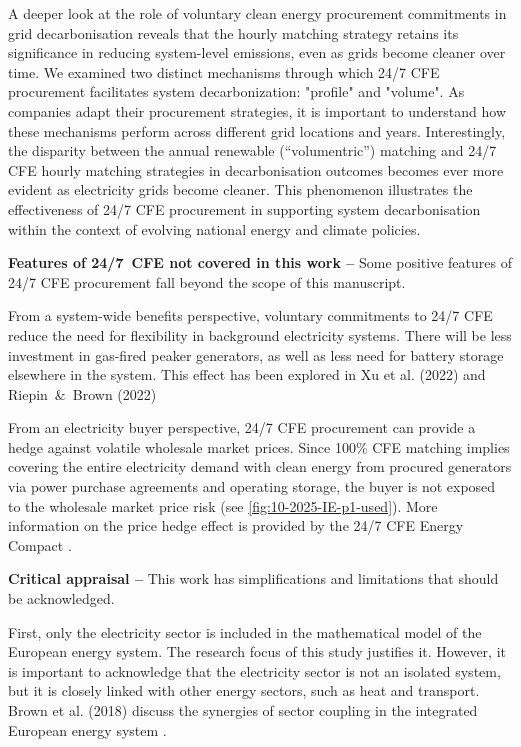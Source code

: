 A deeper look at the role of voluntary clean energy procurement commitments in grid decarbonisation reveals that the hourly matching strategy retains its significance in reducing system-level emissions, even as grids become cleaner over time.
We examined two distinct mechanisms through which 24/7 CFE procurement facilitates system decarbonization: "profile" and "volume".
As companies adapt their procurement strategies, it is important to understand how these mechanisms perform across different grid locations and years.
Interestingly, the disparity between the annual renewable (\enquote{volumentric}) matching and 24/7 CFE hourly matching strategies in decarbonisation outcomes becomes ever more evident as electricity grids become cleaner.
This phenomenon illustrates the effectiveness of 24/7 CFE procurement in supporting system decarbonisation within the context of evolving national energy and climate policies.


\textbf{Features of 24/7~CFE not covered in this work --} Some positive features of 24/7 CFE procurement fall beyond the scope of this manuscript.

From a system-wide benefits perspective, voluntary commitments to 24/7 CFE reduce the need for flexibility in background electricity systems. 
There will be less investment in gas-fired peaker generators, as well as less need for battery storage elsewhere in the system.
This effect has been explored in Xu et al. (2022) and Riepin~\&~Brown (2022) \cite{riepin-zenodo-systemlevel247,xu-247CFE-report}

From an electricity buyer perspective, 24/7 CFE procurement can provide a hedge against volatile wholesale market prices.
Since 100\% CFE matching implies covering the entire electricity demand with clean energy from procured generators via power purchase agreements and operating storage, the buyer is not exposed to the wholesale market price risk (see \cref{fig:10-2025-IE-p1-used}).
More information on the price hedge effect is provided by the 24/7 CFE Energy Compact \cite{gocarbonfree247}.


\textbf{Critical appraisal --} This work has simplifications and limitations that should be acknowledged.

First, only the electricity sector is included in the mathematical model of the European energy system.
The research focus of this study justifies it.
However, it is important to acknowledge that the electricity sector is not an isolated system, but it is closely linked with other energy sectors, such as heat and transport.
Brown et al. (2018) discuss the synergies of sector coupling in the integrated European energy system \cite{brownSynergiesSectorCoupling2018}.

